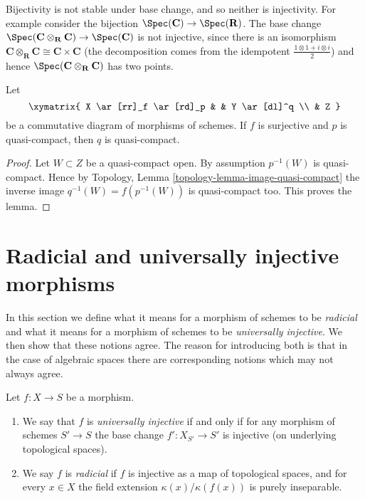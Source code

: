 \begin{example}
\label{example-injective-not-preserved-base-change}
Bijectivity is not stable under base change, and so neither is injectivity.
For example consider the bijection
$\Spec(\mathbf{C}) \to \Spec(\mathbf{R})$.
The base change
$\Spec(\mathbf{C} \otimes_{\mathbf{R}} \mathbf{C}) \to
\Spec(\mathbf{C})$
is not injective, since there is an isomorphism
$\mathbf{C} \otimes_{\mathbf{R}} \mathbf{C} \cong \mathbf{C} \times \mathbf{C}$
(the decomposition comes from the idempotent
$\frac{1 \otimes 1 + i \otimes i}{2}$) and hence
$\Spec(\mathbf{C} \otimes_{\mathbf{R}} \mathbf{C})$ has two points.
\end{example}

\begin{lemma}
\label{lemma-surjection-from-quasi-compact}
Let
$$
\xymatrix{
X \ar[rr]_f \ar[rd]_p & &
Y \ar[dl]^q \\
& Z
}
$$
be a commutative diagram of morphisms of schemes.
If $f$ is surjective and $p$ is quasi-compact, then $q$ is quasi-compact.
\end{lemma}

\begin{proof}
Let $W \subset Z$ be a quasi-compact open. By assumption $p^{-1}(W)$
is quasi-compact. Hence by
Topology, Lemma \ref{topology-lemma-image-quasi-compact}
the inverse image $q^{-1}(W) = f(p^{-1}(W))$ is quasi-compact too.
This proves the lemma.
\end{proof}




\section{Radicial and universally injective morphisms}
\label{section-radicial}

\noindent
In this section we define what it means for a morphism of schemes to
be {\it radicial} and what it means for a morphism of schemes to be
{\it universally injective}. We then show that these notions agree.
The reason for introducing both is that in the case of algebraic spaces
there are corresponding notions which may not always agree.

\begin{definition}
\label{definition-universally-injective}
Let $f : X \to S$ be a morphism.
\begin{enumerate}
\item We say that $f$ is {\it universally injective} if and only
if for any morphism of schemes $S' \to S$ the base change
$f' : X_{S'} \to S'$ is injective (on underlying topological spaces).
\item We say $f$ is {\it radicial} if $f$ is injective as a
map of topological spaces, and for every $x \in X$ the field
extension $\kappa(x)/\kappa(f(x))$ is purely inseparable.
\end{enumerate}
\end{definition}

